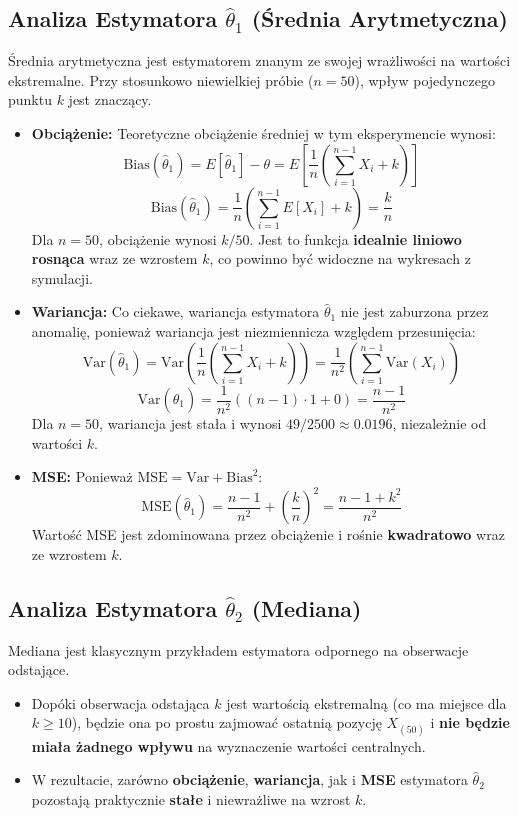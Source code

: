 \documentclass[a4paper,12pt]{article}
\begin{document}
\subsection*{Analiza Estymatora $\hat{\theta}_1$ (Średnia Arytmetyczna)}

Średnia arytmetyczna jest estymatorem znanym ze swojej wrażliwości na wartości ekstremalne. Przy stosunkowo niewielkiej próbie ($n=50$), wpływ pojedynczego punktu $k$ jest znaczący.

\begin{itemize}
    \item \textbf{Obciążenie:} Teoretyczne obciążenie średniej w tym eksperymencie wynosi:
    \[ \text{Bias}(\hat{\theta}_1) = E[\hat{\theta}_1] - \theta = E\left[ \frac{1}{n} \left(\sum_{i=1}^{n-1} X_i + k\right) \right]\]
    \[ \text{Bias}(\hat{\theta}_1) = \frac{1}{n} \left( \sum_{i=1}^{n-1} E[X_i] + k \right) = \frac{k}{n} \]
    Dla $n=50$, obciążenie wynosi $k/50$. Jest to funkcja \textbf{idealnie liniowo rosnąca} wraz ze wzrostem $k$, co powinno być widoczne na wykresach z symulacji.

    \item \textbf{Wariancja:} Co ciekawe, wariancja estymatora $\hat{\theta}_1$ nie jest zaburzona przez anomalię, ponieważ wariancja jest niezmiennicza względem przesunięcia:
    \[ \text{Var}(\hat{\theta}_1) = \text{Var}\left( \frac{1}{n} \left(\sum_{i=1}^{n-1} X_i + k\right) \right) = \frac{1}{n^2} \left( \sum_{i=1}^{n-1} \text{Var}(X_i) \right) \]
    \[ \text{Var}(\hat{\theta}_1) = \frac{1}{n^2} ( (n-1) \cdot 1 + 0 ) = \frac{n-1}{n^2} \]
    Dla $n=50$, wariancja jest stała i wynosi $49/2500 \approx 0.0196$, niezależnie od wartości $k$.

    \item \textbf{MSE:} Ponieważ $\text{MSE} = \text{Var} + \text{Bias}^2$:
    \[ \text{MSE}(\hat{\theta}_1) = \frac{n-1}{n^2} + \left(\frac{k}{n}\right)^2 = \frac{n-1 + k^2}{n^2} \]
    Wartość MSE jest zdominowana przez obciążenie i rośnie \textbf{kwadratowo} wraz ze wzrostem $k$.
\end{itemize}

\subsection*{Analiza Estymatora $\hat{\theta}_2$ (Mediana)}

Mediana jest klasycznym przykładem estymatora odpornego na obserwacje odstające.
\begin{itemize}
    \item Dopóki obserwacja odstająca $k$ jest wartością ekstremalną (co ma miejsce dla $k \ge 10$), będzie ona po prostu zajmować ostatnią pozycję $X_{(50)}$ i \textbf{nie będzie miała żadnego wpływu} na wyznaczenie wartości centralnych.
    \item W rezultacie, zarówno \textbf{obciążenie}, \textbf{wariancja}, jak i \textbf{MSE} estymatora $\hat{\theta}_2$ pozostają praktycznie \textbf{stałe} i niewrażliwe na wzrost $k$.
\end{itemize}
\end{document}
